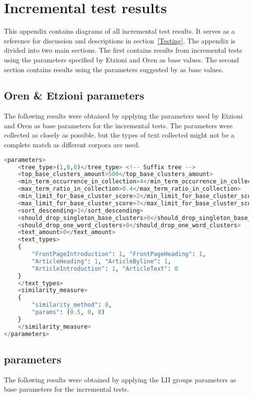 
\chapter{Incremental test results} %

\label{AppendixA} %


This appendix contains diagrams of all incremental test results. It serves as a reference for discussion and descriptions in section~\ref{Testing}. The appendix is divided into two main sections. The first contains results from incremental tests using the parameters specified by Etzioni and Oren as base values. The second section contains results using the parameters suggested by \supervisor as base values.

\section{Oren \& Etzioni parameters}

The following results were obtained by applying the parameters used by Etzioni and Oren as base parameters for the incremental tests. The parameters were collected as closely as possible, but the types of text collected might not be a complete match as different corpora are used.

\begin{lstlisting}[float=t, language=python, label=lst:etzioniparams, caption={Parameter set used in Oren and Etzioni.}]
<parameters>
    <tree_type>(1,0,0)</tree_type> <!-- Suffix tree -->
    <top_base_clusters_amount>500</top_base_clusters_amount>
    <min_term_occurrence_in_collection>4</min_term_occurrence_in_collection>
    <max_term_ratio_in_collection>0.4</max_term_ratio_in_collection>
    <min_limit_for_base_cluster_score>2</min_limit_for_base_cluster_score>
    <max_limit_for_base_cluster_score>7</max_limit_for_base_cluster_score>
    <sort_descending>1</sort_descending>
    <should_drop_singleton_base_clusters>0</should_drop_singleton_base_clusters>
    <should_drop_one_word_clusters>0</should_drop_one_word_clusters>
    <text_amount>0</text_amount>
    <text_types>
    {
    	"FrontPageIntroduction": 1, "FrontPageHeading": 1,
    	"ArticleHeading": 1, "ArticleByline": 1,
    	"ArticleIntroduction": 1, "ArticleText": 0
    }
    </text_types>
    <similarity_measure>
    {
    	"similarity_method": 0,
    	"params": (0.5, 0, 0)
    }
   	</similarity_measure>
</parameters>
\end{lstlisting}



\section{\supervisor parameters}

The following results were obtained by applying the LII groups parameters as base parameters for the incremental tests.

